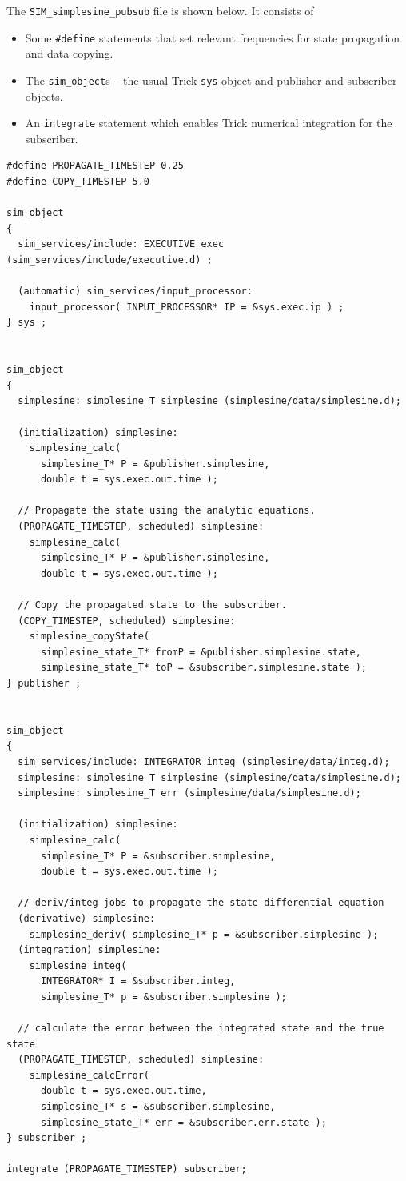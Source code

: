 The {\tt SIM\_simplesine\_pubsub} \sdefine file is shown below. It consists of

\begin{itemize}
  \item{
    Some {\tt \#define} statements that set relevant frequencies for
    state propagation and data copying.
  }
  \item{
    The {\tt sim\_object}s -- the usual Trick {\tt sys} object and
    publisher and subscriber objects.
  }
  \item{
    An {\tt integrate} statement which enables Trick numerical integration
    for the subscriber.
  }
\end{itemize}

\begin{lstlisting}[caption={{\tt SIM\_simplesine\_pubsub} \sdefine file},label={list:SIM-pubsub-sdefine}]
#define PROPAGATE_TIMESTEP 0.25
#define COPY_TIMESTEP 5.0

sim_object
{
  sim_services/include: EXECUTIVE exec (sim_services/include/executive.d) ;

  (automatic) sim_services/input_processor:
    input_processor( INPUT_PROCESSOR* IP = &sys.exec.ip ) ;
} sys ;


sim_object
{
  simplesine: simplesine_T simplesine (simplesine/data/simplesine.d);

  (initialization) simplesine:
    simplesine_calc(
      simplesine_T* P = &publisher.simplesine,
      double t = sys.exec.out.time );

  // Propagate the state using the analytic equations.
  (PROPAGATE_TIMESTEP, scheduled) simplesine:
    simplesine_calc(
      simplesine_T* P = &publisher.simplesine,
      double t = sys.exec.out.time );

  // Copy the propagated state to the subscriber.
  (COPY_TIMESTEP, scheduled) simplesine:
    simplesine_copyState(
      simplesine_state_T* fromP = &publisher.simplesine.state,
      simplesine_state_T* toP = &subscriber.simplesine.state );
} publisher ;


sim_object
{
  sim_services/include: INTEGRATOR integ (simplesine/data/integ.d);
  simplesine: simplesine_T simplesine (simplesine/data/simplesine.d);
  simplesine: simplesine_T err (simplesine/data/simplesine.d);

  (initialization) simplesine:
    simplesine_calc(
      simplesine_T* P = &subscriber.simplesine,
      double t = sys.exec.out.time );

  // deriv/integ jobs to propagate the state differential equation
  (derivative) simplesine:
    simplesine_deriv( simplesine_T* p = &subscriber.simplesine );
  (integration) simplesine:
    simplesine_integ(
      INTEGRATOR* I = &subscriber.integ,
      simplesine_T* p = &subscriber.simplesine );

  // calculate the error between the integrated state and the true state
  (PROPAGATE_TIMESTEP, scheduled) simplesine:
    simplesine_calcError(
      double t = sys.exec.out.time,
      simplesine_T* s = &subscriber.simplesine,
      simplesine_state_T* err = &subscriber.err.state );
} subscriber ;

integrate (PROPAGATE_TIMESTEP) subscriber;
\end{lstlisting}
